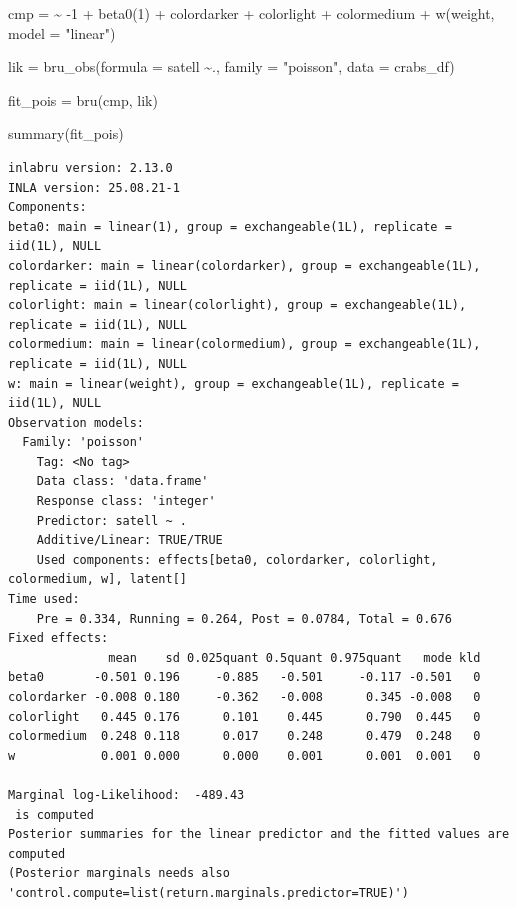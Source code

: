 \documentclass[
  letterpaper,
  DIV=11,
  numbers=noendperiod]{scrartcl}
\newenvironment{Shaded}{\begin{snugshade}}{\end{snugshade}}
\newcommand{\AttributeTok}[1]{\textcolor[rgb]{0.40,0.45,0.13}{#1}}
\newcommand{\DecValTok}[1]{\textcolor[rgb]{0.68,0.00,0.00}{#1}}
\newcommand{\ErrorTok}[1]{\textcolor[rgb]{0.68,0.00,0.00}{#1}}
\newcommand{\FunctionTok}[1]{\textcolor[rgb]{0.28,0.35,0.67}{#1}}
\newcommand{\NormalTok}[1]{\textcolor[rgb]{0.00,0.23,0.31}{#1}}
\newcommand{\OtherTok}[1]{\textcolor[rgb]{0.00,0.23,0.31}{#1}}
\newcommand{\SpecialCharTok}[1]{\textcolor[rgb]{0.37,0.37,0.37}{#1}}
\newcommand{\StringTok}[1]{\textcolor[rgb]{0.13,0.47,0.30}{#1}}
\begin{document}
\begin{Shaded}
\begin{Highlighting}[]
\NormalTok{cmp }\OtherTok{=}  \ErrorTok{\textasciitilde{}} \SpecialCharTok{{-}}\DecValTok{1} \SpecialCharTok{+} \FunctionTok{beta0}\NormalTok{(}\DecValTok{1}\NormalTok{) }\SpecialCharTok{+}\NormalTok{  colordarker }\SpecialCharTok{+}
\NormalTok{       colorlight }\SpecialCharTok{+}\NormalTok{ colormedium }\SpecialCharTok{+}
       \FunctionTok{w}\NormalTok{(weight, }\AttributeTok{model =} \StringTok{"linear"}\NormalTok{)}

\NormalTok{lik }\OtherTok{=}  \FunctionTok{bru\_obs}\NormalTok{(}\AttributeTok{formula =}\NormalTok{ satell }\SpecialCharTok{\textasciitilde{}}\NormalTok{.,}
            \AttributeTok{family =} \StringTok{"poisson"}\NormalTok{,}
            \AttributeTok{data =}\NormalTok{ crabs\_df)}

\NormalTok{fit\_pois }\OtherTok{=} \FunctionTok{bru}\NormalTok{(cmp, lik)}

\FunctionTok{summary}\NormalTok{(fit\_pois)}
\end{Highlighting}
\end{Shaded}

\begin{verbatim}
inlabru version: 2.13.0
INLA version: 25.08.21-1
Components:
beta0: main = linear(1), group = exchangeable(1L), replicate = iid(1L), NULL
colordarker: main = linear(colordarker), group = exchangeable(1L), replicate = iid(1L), NULL
colorlight: main = linear(colorlight), group = exchangeable(1L), replicate = iid(1L), NULL
colormedium: main = linear(colormedium), group = exchangeable(1L), replicate = iid(1L), NULL
w: main = linear(weight), group = exchangeable(1L), replicate = iid(1L), NULL
Observation models:
  Family: 'poisson'
    Tag: <No tag>
    Data class: 'data.frame'
    Response class: 'integer'
    Predictor: satell ~ .
    Additive/Linear: TRUE/TRUE
    Used components: effects[beta0, colordarker, colorlight, colormedium, w], latent[]
Time used:
    Pre = 0.334, Running = 0.264, Post = 0.0784, Total = 0.676 
Fixed effects:
              mean    sd 0.025quant 0.5quant 0.975quant   mode kld
beta0       -0.501 0.196     -0.885   -0.501     -0.117 -0.501   0
colordarker -0.008 0.180     -0.362   -0.008      0.345 -0.008   0
colorlight   0.445 0.176      0.101    0.445      0.790  0.445   0
colormedium  0.248 0.118      0.017    0.248      0.479  0.248   0
w            0.001 0.000      0.000    0.001      0.001  0.001   0

Marginal log-Likelihood:  -489.43 
 is computed 
Posterior summaries for the linear predictor and the fitted values are computed
(Posterior marginals needs also 'control.compute=list(return.marginals.predictor=TRUE)')
\end{verbatim}
\end{document}
